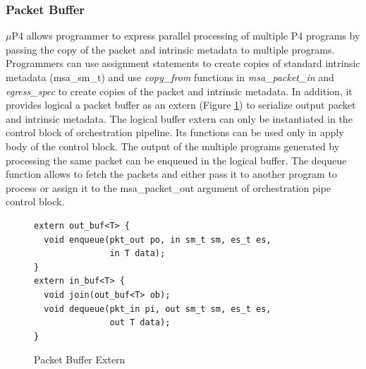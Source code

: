 \subsubsection{Packet Buffer}
$\mu$P4 allows programmer to express parallel processing of multiple P4 programs by passing the copy of the packet and intrinsic metadata to multiple programs.
Programmers can use assignment statements to create copies of standard intrinsic metadata (msa\_sm\_t) and use \emph{copy\_from} functions in \emph{msa\_packet\_in} and \emph{egress\_spec} to create copies of the packet and intrinsic metadata.
In addition, it provides logical a packet buffer as an extern (Figure \ref{fig:msa-packet-buffer-extern}) to serialize output packet and intrinsic metadata.
The logical buffer extern can only be instantiated in the control block of orchestration pipeline.
Its functions can be used only in apply body of the control block.
The output of the multiple programs generated by processing the same packet can be enqueued in the logical buffer.
The dequeue function allows to fetch the packets and either pass it to another program to process or assign it to the msa\_packet\_out argument of orchestration pipe control block.
\begin{figure}[!h]
\begin{lstlisting}[frame=none]
extern out_buf<T> {
  void enqueue(pkt_out po, in sm_t sm, es_t es,
               in T data); 
}
extern in_buf<T> {
  void join(out_buf<T> ob);
  void dequeue(pkt_in pi, out sm_t sm, es_t es, 
               out T data); 
}
\end{lstlisting}
\caption{Packet Buffer Extern}
\label{fig:msa-packet-buffer-extern}
\end{figure}
